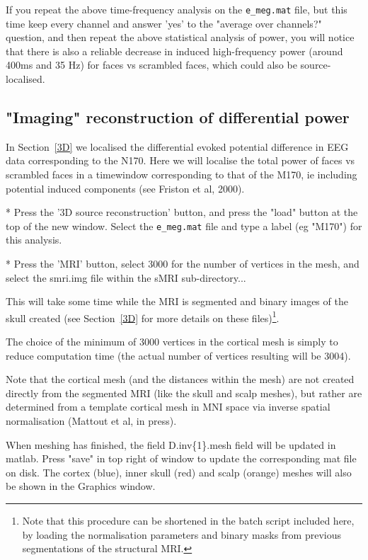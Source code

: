 If you repeat the above time-frequency analysis on the \verb!e_meg.mat! file, but this time keep every channel and answer 'yes' to the "average over channels?" question, and then repeat the above statistical analysis of power, you will notice that there is also a reliable decrease in induced high-frequency power (around 400ms and 35 Hz) for faces vs scrambled faces, which could also be source-localised.


\subsection{"Imaging" reconstruction of differential power}

In Section~\ref{3D} we localised the differential evoked potential difference in EEG data corresponding to the N170.  Here we will localise the total power of faces vs scrambled faces in a timewindow corresponding to that of the M170, ie including potential induced components (see Friston et al, 2000).

* Press the '3D source reconstruction' button, and press the "load" button at the top of the new window. Select the \verb!e_meg.mat! file and type a label (eg "M170") for this analysis.

* Press the 'MRI' button, select 3000 for the number of vertices in the mesh, and select the smri.img file within the sMRI sub-directory...

This will take some time while the MRI is segmented and binary images of the skull created (see Section~\ref{3D} for more details on these files)\footnote{Note that this procedure can be shortened in the batch script included here, by loading the normalisation parameters and binary masks from previous segmentations of the structural MRI.}.

The choice of the minimum of 3000 vertices in the cortical mesh is simply to reduce computation time (the actual number of vertices resulting will be 3004).

Note that the cortical mesh (and the distances within the mesh) are not created directly from the segmented MRI (like the skull and scalp meshes), but rather are determined from a template cortical mesh in MNI space via inverse spatial normalisation (Mattout et al, in press).

When meshing has finished, the field D.inv\{1\}.mesh field will be updated in matlab. Press "save" in top right of window to update the corresponding mat file on disk. The cortex (blue), inner skull (red) and scalp (orange) meshes will also be shown in the Graphics window.

